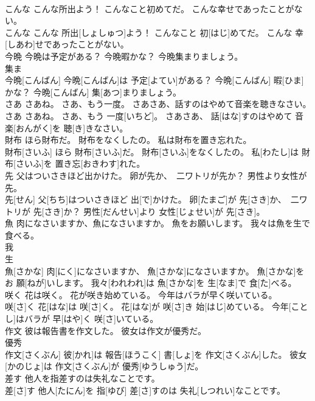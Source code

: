 \documentclass[8pt]{extreport}
\begin{document}
\begin{CJK}{UTF8}{min}
\\	こんな こんな所出よう！ こんなこと初めてだ。 こんな幸せであったことがない。	
\\	こんな こんな 所出[しょしゅつ]よう！ こんなこと 初[はじ]めてだ。 こんな 幸[しあわ]せであったことがない。
\\	今晩 今晩は予定がある？ 今晩暇かな？ 今晩集まりましょう。	
\\	集ま 
\\	今晩[こんばん] 今晩[こんばん]は 予定[よてい]がある？ 今晩[こんばん] 暇[ひま]かな？ 今晩[こんばん] 集[あつ]まりましょう。
\\	さあ さあね。 さあ、もう一度。 さあさあ、話すのはやめて音楽を聴きなさい。	
\\	さあ さあね。 さあ、もう 一度[いちど]。 さあさあ、 話[はな]すのはやめて 音楽[おんがく]を 聴[き]きなさい。
\\	財布 ほら財布だ。 財布をなくしたの。 私は財布を置き忘れた。	
\\	財布[さいふ] ほら 財布[さいふ]だ。 財布[さいふ]をなくしたの。 私[わたし]は 財布[さいふ]を 置き忘[おきわす]れた。
\\	先 父はついさきほど出かけた。 卵が先か、　二ワトリが先か？ 男性より女性が先。	
\\	先[せん] 父[ちち]はついさきほど 出[で]かけた。 卵[たまご]が 先[さき]か、　二ワトリが 先[さき]か？ 男性[だんせい]より 女性[じょせい]が 先[さき]。
\\	魚 肉になさいますか、魚になさいますか。 魚をお願いします。 我々は魚を生で食べる。	
\\	我 
\\	生
\\	魚[さかな] 肉[にく]になさいますか、 魚[さかな]になさいますか。 魚[さかな]をお 願[ねが]いします。 我々[われわれ]は 魚[さかな]を 生[なま]で 食[た]べる。
\\	咲く 花は咲く。 花が咲き始めている。 今年はバラが早く咲いている。	
\\	咲[さ]く 花[はな]は 咲[さ]く。 花[はな]が 咲[さ]き 始[はじ]めている。 今年[ことし]はバラが 早[はや]く 咲[さ]いている。
\\	作文 彼は報告書を作文した。 彼女は作文が優秀だ。	
\\	優秀 
\\	作文[さくぶん] 彼[かれ]は 報告[ほうこく] 書[しょ]を 作文[さくぶん]した。 彼女[かのじょ]は 作文[さくぶん]が 優秀[ゆうしゅう]だ。
\\	差す 他人を指差すのは失礼なことです。	
\\	差[さ]す 他人[たにん]を 指[ゆび] 差[さ]すのは 失礼[しつれい]なことです。

\end{CJK}
\end{document}
